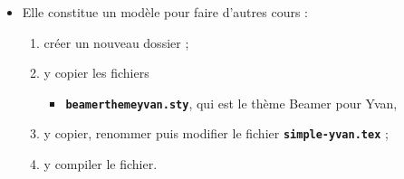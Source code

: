   \begin{itemize}
  \item Elle constitue un modèle pour faire d'autres cours :
      
    \begin{enumerate}
    \item créer un nouveau dossier ;
    \item y copier les fichiers 
      
      \begin{itemize}
      \item \texttt{\textbf{beamerthemeyvan.sty}}, qui est le thème Beamer pour Yvan,
      \end{itemize}
      
    \item y copier, renommer puis modifier le fichier \texttt{\textbf{simple-yvan.tex}} ;
    \item y compiler le fichier.
    \end{enumerate}
  \end{itemize}
